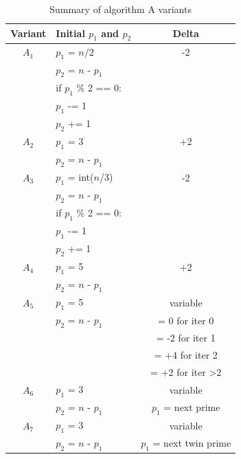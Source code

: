 \documentclass[10pt,twocolumn]{article}
\begin{document}
\begin{table}[t]
\centering
\caption{Summary of algorithm A variants}
\label{tablealgo}
\begin{tabular}{|c|l|c|}
  \hline 
  \rowcolor{LightCyan}
  Variant & Initial $p_1$ and $p_2$  & Delta \\
  \hline 
  $A_1$ & $p_1$ = $n/2$   & -2 \\
       & $p_2$ = $n$ - $p_1$ & \\
       & if $p_1$ \% 2 == 0:  &\\
       & \hspace{0.2cm} $p_1$ -= 1         & \\
       & \hspace{0.2cm} $p_2$ += 1       & \\
  \hline
  $A_2$ & $p_1$ = 3   & +2 \\
       &  $p_2$ = $n$ - $p_1$  &\\
  \hline 
  $A_3$ & $p_1$ = int($n$/3)  & -2 \\
       & $p_2$ = $n$ - $p_1$ & \\
       & if $p_1$ \% 2 == 0:  &\\
       & \hspace{0.2cm} $p_1$ -= 1         & \\
       & \hspace{0.2cm} $p_2$ += 1       & \\
  \hline
  $A_4$ & $p_1$ = 5   & +2 \\
       &  $p_2$ = $n$ - $p_1$  &\\
  \hline 
  $A_5$ & $p_1$ = 5   & variable \\
       &  $p_2$ = $n$ - $p_1$  & = 0 for iter 0 \\
       &  & = -2 for iter 1 \\
       &  & = +4 for iter 2 \\
       &  & = +2 for iter \textgreater 2 \\
  \hline 
  $A_6$ & $p_1$ = 3   & variable \\
       &  $p_2$ = $n$ - $p_1$  & $p_1$ = next prime \\
  \hline 
  $A_7$ & $p_1$ = 3   & variable \\
       &  $p_2$ = $n$ - $p_1$  & $p_1$ = next twin prime \\
  \hline 
\end{tabular} 
\end{table}
\end{document}
